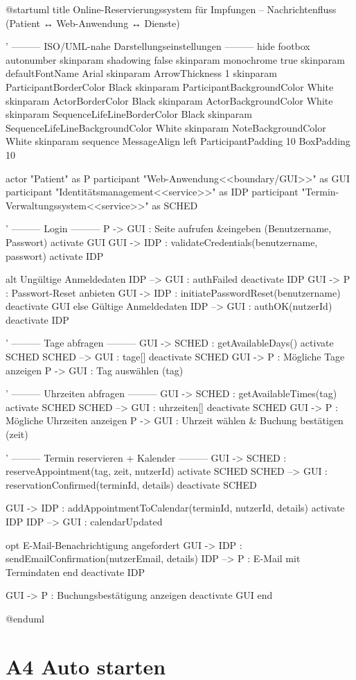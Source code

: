 \documentclass[12pt]{article}
\begin{document}
\begin{plantuml}
@startuml
title Online-Reservierungssystem für Impfungen – Nachrichtenfluss (Patient ↔ Web-Anwendung ↔ Dienste)

' ——— ISO/UML-nahe Darstellungseinstellungen ———
hide footbox
autonumber
skinparam shadowing false
skinparam monochrome true
skinparam defaultFontName Arial
skinparam ArrowThickness 1
skinparam ParticipantBorderColor Black
skinparam ParticipantBackgroundColor White
skinparam ActorBorderColor Black
skinparam ActorBackgroundColor White
skinparam SequenceLifeLineBorderColor Black
skinparam SequenceLifeLineBackgroundColor White
skinparam NoteBackgroundColor White
skinparam sequence {
  MessageAlign left
  ParticipantPadding 10
  BoxPadding 10
}

actor "Patient" as P
participant "Web-Anwendung\n<<boundary/GUI>>" as GUI
participant "Identitätsmanagement\n<<service>>" as IDP
participant "Termin-Verwaltungssystem\n<<service>>" as SCHED

' ——— Login ———
P -> GUI : Seite aufrufen &\nAnmeldedaten eingeben (Benutzername, Passwort)
activate GUI
GUI -> IDP : validateCredentials(benutzername, passwort)
activate IDP

alt Ungültige Anmeldedaten
  IDP --> GUI : authFailed
  deactivate IDP
  GUI -> P : Passwort-Reset anbieten
  GUI -> IDP : initiatePasswordReset(benutzername)
  deactivate GUI
else Gültige Anmeldedaten
  IDP --> GUI : authOK(nutzerId)
  deactivate IDP

  ' ——— Tage abfragen ———
  GUI -> SCHED : getAvailableDays()
  activate SCHED
  SCHED --> GUI : tage[]
  deactivate SCHED
  GUI -> P : Mögliche Tage anzeigen
  P -> GUI : Tag auswählen (tag)

  ' ——— Uhrzeiten abfragen ———
  GUI -> SCHED : getAvailableTimes(tag)
  activate SCHED
  SCHED --> GUI : uhrzeiten[]
  deactivate SCHED
  GUI -> P : Mögliche Uhrzeiten anzeigen
  P -> GUI : Uhrzeit wählen & Buchung bestätigen (zeit)

  ' ——— Termin reservieren + Kalender ———
  GUI -> SCHED : reserveAppointment(tag, zeit, nutzerId)
  activate SCHED
  SCHED --> GUI : reservationConfirmed(terminId, details)
  deactivate SCHED

  GUI -> IDP : addAppointmentToCalendar(terminId, nutzerId, details)
  activate IDP
  IDP --> GUI : calendarUpdated

  opt E-Mail-Benachrichtigung angefordert
    GUI -> IDP : sendEmailConfirmation(nutzerEmail, details)
    IDP --> P : E-Mail mit Termindaten
  end
  deactivate IDP

  GUI -> P : Buchungsbestätigung anzeigen
  deactivate GUI
end

@enduml
  
\end{plantuml}



\section*{A4 Auto starten}
\end{document}
